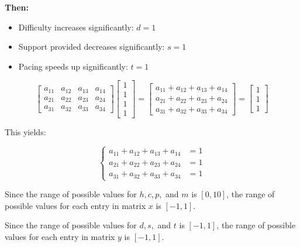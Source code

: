 \documentclass{article}
\begin{document}
        \textbf{Then:}
        \begin{itemize}
            \item Difficulty increases significantly: $d = 1$
            \item Support provided decreases significantly: $s = 1$
            \item Pacing speeds up significantly: $t = 1$
        \end{itemize}

        \[
            \begin{bmatrix} 
                a_{11} & a_{12} & a_{13} & a_{14} \\
                a_{21} & a_{22} & a_{23} & a_{24} \\
                a_{31} & a_{32} & a_{33} & a_{34}
            \end{bmatrix}
            \begin{bmatrix} 1 \\ 1 \\ 1 \\ 1 \end{bmatrix}
            = 
            \begin{bmatrix}
                a_{11} + a_{12} + a_{13} + a_{14} \\
                a_{21} + a_{22} + a_{23} + a_{24} \\
                a_{31} + a_{32} + a_{33} + a_{34}
            \end{bmatrix}
            =
            \begin{bmatrix} 1 \\ 1 \\ 1 \end{bmatrix}
        \]

        This yields:

        \[
            \left\{
                \begin{aligned}
                    a_{11} + a_{12} + a_{13} + a_{14} &= 1 \\
                    a_{21} + a_{22} + a_{23} + a_{24} &= 1 \\
                    a_{31} + a_{32} + a_{33} + a_{34} &= 1
                \end{aligned}
            \right.
        \]

        Since the range of possible values for $h, c, p,$ and $m$ is $[0, 10]$, the range of possible values for each entry in matrix $x$ is $[-1, 1]$.

        Since the range of possible values for $d, s,$ and $t$ is $[-1, 1]$, the range of possible values for each entry in matrix $y$ is $[-1, 1]$.
\end{document}
